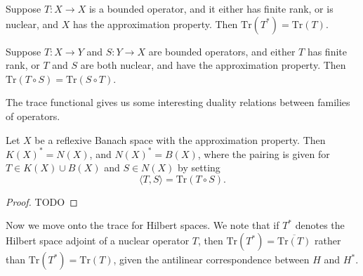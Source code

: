 \begin{theorem}
    Suppose $T: X \to X$ is a bounded operator, and it either has finite rank, or is nuclear, and $X$ has the approximation property. Then $\text{Tr}(T^*) = \text{Tr}(T)$.
\end{theorem}

\begin{theorem}
    Suppose $T: X \to Y$ and $S: Y \to X$ are bounded operators, and either $T$ has finite rank, or $T$ and $S$ are both nuclear, and have the approximation property. Then $\text{Tr}(T \circ S) = \text{Tr}(S \circ T)$.
\end{theorem}

The trace functional gives us some interesting duality relations between families of operators.

\begin{theorem}
    Let $X$ be a reflexive Banach space with the approximation property. Then $K(X)^* = N(X)$, and $N(X)^* = B(X)$, where the pairing is given for $T \in K(X) \cup B(X)$ and $S \in N(X)$ by setting
    \[ \langle T, S \rangle = \text{Tr}(T \circ S). \]
\end{theorem}
\begin{proof}
    TODO
\end{proof}

Now we move onto the trace for Hilbert spaces. We note that if $T^*$ denotes the Hilbert space adjoint of a nuclear operator $T$, then $\text{Tr}(T^*) = \overline{\text{Tr}(T)}$ rather than $\text{Tr}(T^*) = \text{Tr}(T)$, given the antilinear correspondence between $H$ and $H^*$.

